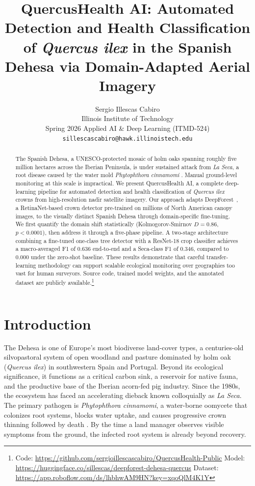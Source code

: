 \documentclass[10pt,twocolumn]{article}
\title{QuercusHealth AI: Automated Detection and Health
  Classification of \textit{Quercus ilex} in the Spanish Dehesa
  via Domain-Adapted Aerial Imagery}
\author{%
  Sergio Illescas Cabiro \\
  Illinois Institute of Technology \\
  Spring 2026 Applied AI \& Deep Learning (ITMD-524) \\
  \texttt{sillescascabiro@hawk.illinoistech.edu}
}
\begin{document}
\maketitle

\begin{abstract}
The Spanish Dehesa, a UNESCO-protected mosaic of holm oaks spanning
roughly five million hectares across the Iberian Peninsula, is under
sustained attack from \textit{La Seca}, a root disease caused by the
water mold \textit{Phytophthora cinnamomi} \cite{brasier1993evidence}.
Manual ground-level monitoring at this scale is impractical. We present
QuercusHealth AI, a complete deep-learning pipeline for automated detection
and health classification of \textit{Quercus ilex} crowns from
high-resolution nadir satellite imagery. Our approach adapts
DeepForest~\cite{weinstein2020deepforest}, a RetinaNet-based crown detector
pre-trained on millions of North American canopy images, to the visually
distinct Spanish Dehesa through domain-specific fine-tuning. We first
quantify the domain shift statistically (Kolmogorov-Smirnov $D = 0.86$,
$p < 0.0001$), then address it through a five-phase pipeline. A two-stage
architecture combining a fine-tuned one-class tree detector with a ResNet-18
crop classifier achieves a macro-averaged F1 of 0.636 end-to-end and a
Seca-class F1 of 0.346, compared to 0.000 under the zero-shot baseline.
These results demonstrate that careful transfer-learning methodology can
support scalable ecological monitoring over geographies too vast for human
surveyors. Source code, trained model weights, and the annotated dataset are
publicly available.\footnote{Code:
\url{https://github.com/sergioillescascabiro/QuercusHealth-Public}
\quad Model:
\url{https://huggingface.co/sillescas/deepforest-dehesa-quercus}
\quad Dataset:
\url{https://app.roboflow.com/ds/lhbhwAM9HN?key=xqoQlM4K1Y}}
\end{abstract}

\section{Introduction}
\label{sec:intro}

The Dehesa is one of Europe's most biodiverse land-cover types, a
centuries-old silvopastoral system of open woodland and pasture dominated
by holm oak (\textit{Quercus ilex}) in southwestern Spain and Portugal.
Beyond its ecological significance, it functions as a critical carbon sink,
a reservoir for native fauna, and the productive base of the Iberian
acorn-fed pig industry. Since the 1980s, the ecosystem has faced an
accelerating dieback known colloquially as \textit{La Seca}. The primary
pathogen is \textit{Phytophthora cinnamomi}, a water-borne oomycete that
colonizes root systems, blocks water uptake, and causes progressive crown
thinning followed by death \cite{goberna2003dehesa}. By the time a
land manager observes visible symptoms from the ground, the infected root
system is already beyond recovery.
\end{document}
